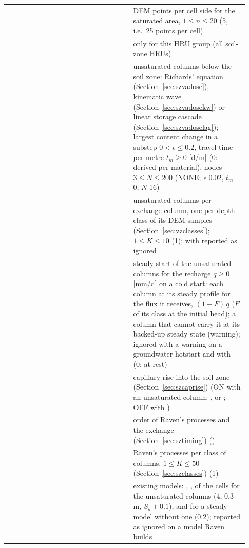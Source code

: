 \begin{longtable}{P{0.08\linewidth}P{0.4\linewidth}P{0.448\linewidth}}
 &  & DEM points per cell side for the saturated area, $1\le n\le20$ (5, i.e.\ 25 points per cell)\label{cmd:SoilZoneSubgrid}\\
 &  &  only for this HRU group (all soil-zone HRUs)\label{cmd:SoilZoneOutput}\\
 &  & unsaturated columns below the soil zone: Richards' equation (Section~\ref{sec:szvadose}), kinematic wave (Section~\ref{sec:szvadosekw}) or linear storage cascade (Section~\ref{sec:szvadoselag}); largest content change in a substep $0<\epsilon\le0.2$, travel time per metre $t_m\ge0$ [d/m] (0: derived per material), nodes $3\le N\le200$ (NONE; $\epsilon$ 0.02, $t_m$ 0, $N$ 16)\label{cmd:SoilZoneVadose}\\
 &  & unsaturated columns per exchange column, one per depth class of its DEM samples (Section~\ref{sec:vzclasses}); $1\le K\le10$ (1); with  reported as ignored\label{cmd:SoilZoneVadoseClasses}\\
 &  & steady start of the unsaturated columns for the recharge $q\ge0$ [mm/d] on a cold start: each column at its steady profile for the flux it receives, $(1-F)\,q$ ($F$ of its class at the initial head); a column that cannot carry it at its backed-up steady state (warning); ignored with a warning on a groundwater hotstart and with  (0: at rest)\label{cmd:SoilZoneVadoseInitialFlux}\\
 &  & capillary rise into the soil zone (Section~\ref{sec:szcaprise}) (ON with an unsaturated column: ,  or ; OFF with )\label{cmd:SoilZoneCapillaryRise}\\
 &  & order of Raven's processes and the exchange (Section~\ref{sec:sztiming}) ()\label{cmd:SoilZoneExchangeTiming}\\
 &  & Raven's processes per class of columns, $1\le K\le50$ (Section~\ref{sec:szclasses}) (1)\label{cmd:SoilZoneClasses}\\
 &  & existing models: , ,  of the cells for the unsaturated columns (4, 0.3 m, $S_y+0.1$), and  for a steady model without one (0.2); reported as ignored on a model Raven builds\label{cmd:SoilZoneAquiferClass}\\

\end{longtable}
